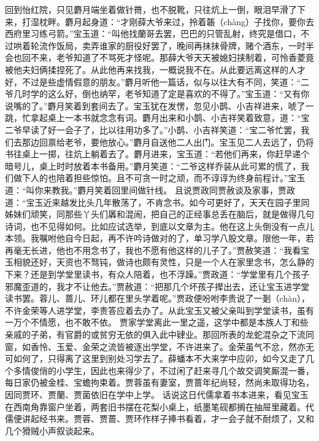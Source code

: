 \documentclass[12pt,oneside]{book}
\begin{document}
回到怡红院，只见麝月端坐着做针黹，也不脱靴，只往炕上一倒，眼泪早滑了下来，打湿枕畔。麝月起身道：“才刚薛大爷来过，拎着韔（chàng）子找你，要你去西府里习练弓箭。”宝玉道：“叫他找蘭哥去罢，巴巴的只管乱射，终究是借口，不过哄着轮流作饭局，卖弄谁家的厨役好罢了，晚间再抹抹骨牌，赌个酒东，一时半会也回不来，老爷知道了不骂死才怪呢。那薛大爷天天被媳妇挟制着，可怜香菱竟被他夫妇俩揉捏死了。从此他再来找我，一概说我不在。从此要远离这样的人才好，不过是些虚情假意的朋友。”麝月听他一篇话，似与以往大有不同，笑道：“二爷几时学的这么好，倒也纳罕，老爷知道了定是喜欢的不得了。”宝玉道：“又有你说嘴的了。”麝月笑着到套间去了。宝玉犹在发愣，忽见小鹊、小吉祥进来，唬了一跳，忙拿起桌上一本书就念念有词。麝月出来和小鹊、小吉祥笑着致意，道：“宝二爷早读了好一会子了，比以往用功多了。”小鹊、小吉祥笑道：“宝二爷忙罢，我们去那边回禀给老爷，要他放心。”麝月自送他二人出门。宝玉见二人去远了，仍将书往桌上一掷，往炕上躺着去了。麝月进来，宝玉道：“若他们再来，你赶早递个暗号儿，桌上时时放着本书备用。”麝月笑道：“二爷这样乔装从此可累的慌了，我们做下人的也陪着担些惊怕。且不可贪一时之顽，而不谆谆为终身前程计。”宝玉道：“叫你来教我。”麝月笑着回里间做针线。
且说贾政同贾赦谈及家事，贾政道：“宝玉近来越发比头几年散荡了，不肯念书。如今可更好了，天天在园子里同姊妹们顽笑，同那些丫头们羼和混闹，把自己的正经事总丢在脑后，就是做得几句诗词，也不见得如何。比如应试选举，到底以文章为主。他在这上头倒没有一点儿本领。我嘱咐他自今日起，再不许吟诗做对的了，单习学八股文章。限他一年，若再毫无长进，他也不用念书了，我也不愿有他这样的儿子了。”贾赦笑道：“我看宝玉相貌还好，天资也不驽钝，做诗也颇有灵性，只是一个人在家里念书，怎么静的下来？还是到学堂里读书，有众人陪着，也不浮躁。”贾政道：“学堂里有几个孩子邪魔歪道的，我才不让他去。”贾赦道：“把那几个坏孩子撵出去，还让宝玉进学堂读书罢。蓉儿、蔷儿、环儿都在里头学着呢。”贾政便吩咐李贵说了一剗（chàn），不许金荣等人进学堂，李贵答应着去办了。从此宝玉又被父亲叫到学堂读书，虽有一万个不情愿，也不敢不依。
贾家学堂离此一里之遥，这学中都是本族人丁和些亲戚的子弟，有官爵的或贫穷无依的俱入此中肄业。那回所表的龙蛇混杂之下流同窗，如香怜、玉爱、金荣之流皆被逐出学堂，不许进来了。金荣虽气不忿，然亦无可如何了，只得离了这里到别处习学去了。薛蟠本不大来学中应卯，如今又走了几个多情俊俏的小学生，因此也来得少了，不过闲了赶来寻几个故交调笑厮混一番，每日家仍被金桂、宝蟾拘束着。贾蓉虽有妻室，贾蔷年纪尚轻，然尚未取得功名，因同贾环、贾蘭、贾菌依旧在学中上学。
话说这日代儒拿着书本进来，看见宝玉在西南角靠窗户坐着，两套旧书摆在花梨小桌上，纸墨笔砚都搁在抽屉里藏着。代儒便讲起经书来。贾蓉、贾蔷、贾环作样子捧书看着，才一会子就不耐烦了，又和几个猾贼小声叙谈起来。
\end{document}
